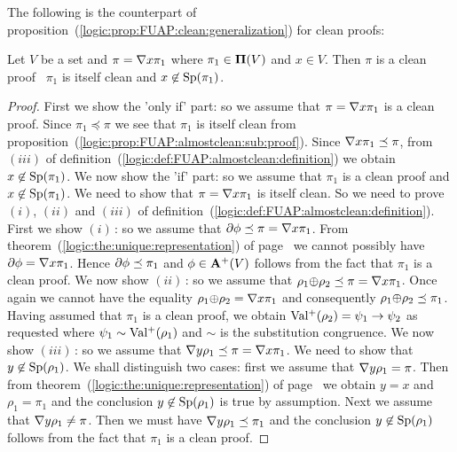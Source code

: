 The following is the counterpart of
proposition~(\ref{logic:prop:FUAP:clean:generalization}) for clean
proofs:
\begin{prop}\label{logic:prop:FUAP:almostclean:generalization}
Let $V$ be a set and $\pi=\mbox{$\nabla$} x\pi_{1}$ where $\pi_{1}\in\mbox{${\bf\Pi}(V)$}$ and
$x\in V$. Then $\pi$ is a clean proof \ifand\ $\pi_{1}$ is itself
clean and $x\not\in\mbox{\rm Sp}(\pi_{1})$.
\end{prop}
\begin{proof}
First we show the 'only if' part: so we assume that $\pi=\mbox{$\nabla$}
x\pi_{1}$ is a clean proof. Since $\pi_{1}\preceq\pi$ we see that
$\pi_{1}$ is itself clean from
proposition~(\ref{logic:prop:FUAP:almostclean:sub:proof}). Since
$\mbox{$\nabla$} x\pi_{1}\preceq\pi$, from $(iii)$ of
definition~(\ref{logic:def:FUAP:almostclean:definition}) we obtain
$x\not\in\mbox{\rm Sp}(\pi_{1})$. We now show the 'if' part: so we assume
that $\pi_{1}$ is a clean proof and $x\not\in\mbox{\rm Sp}(\pi_{1})$. We
need to show that $\pi=\mbox{$\nabla$} x\pi_{1}$ is itself clean. So we need to
prove $(i)$, $(ii)$ and $(iii)$ of
definition~(\ref{logic:def:FUAP:almostclean:definition}). First we
show $(i)$\,: so we assume that $\mbox{$\partial$}\phi\preceq\pi=\mbox{$\nabla$} x\pi_{1}$.
From theorem~(\ref{logic:the:unique:representation}) of
page~\pageref{logic:the:unique:representation} we cannot possibly
have $\mbox{$\partial$}\phi=\mbox{$\nabla$} x\pi_{1}$. Hence $\mbox{$\partial$}\phi\preceq\pi_{1}$ and
$\phi\in\mbox{${\bf A}^{+}(V)$}$ follows from the fact that $\pi_{1}$ is a clean proof.
We now show $(ii)$\,: so we assume that
$\rho_{1}\mbox{$\oplus$}\rho_{2}\preceq\pi=\mbox{$\nabla$} x\pi_{1}$. Once again we cannot
have the equality $\rho_{1}\mbox{$\oplus$}\rho_{2}=\mbox{$\nabla$} x\pi_{1}$ and
consequently $\rho_{1}\mbox{$\oplus$}\rho_{2}\preceq\pi_{1}$. Having assumed
that $\pi_{1}$ is a clean proof, we obtain
$\mbox{$\rm Val^{+}$}(\rho_{2})=\psi_{1}\to\psi_{2}$ as requested where
$\psi_{1}\sim\mbox{$\rm Val^{+}$}(\rho_{1})$ and $\sim$ is the substitution
congruence. We now show $(iii)$\,: so we assume that $\mbox{$\nabla$}
y\rho_{1}\preceq\pi=\mbox{$\nabla$} x\pi_{1}$. We need to show that
$y\not\in\mbox{\rm Sp}(\rho_{1})$. We shall distinguish two cases: first we
assume that $\mbox{$\nabla$} y\rho_{1}=\pi$. Then from
theorem~(\ref{logic:the:unique:representation}) of
page~\pageref{logic:the:unique:representation} we obtain $y=x$ and
$\rho_{1}=\pi_{1}$ and the conclusion $y\not\in\mbox{\rm Sp}(\rho_{1})$ is
true by assumption. Next we assume that $\mbox{$\nabla$} y\rho_{1}\neq\pi$.
Then we must have $\mbox{$\nabla$} y\rho_{1}\preceq\pi_{1}$ and the conclusion
$y\not\in\mbox{\rm Sp}(\rho_{1})$ follows from the fact that $\pi_{1}$ is a
clean proof.
\end{proof}

